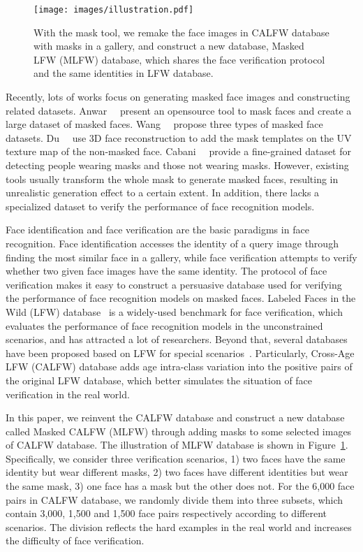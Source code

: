 \documentclass[final]{cvpr}
\begin{document}
\begin{figure}
	\begin{center}
		\texttt{[image: images/illustration.pdf]}
	\end{center}
	\caption{
		With the mask tool, we remake the face images in CALFW database with masks in a gallery, and construct a new database, Masked LFW (MLFW) database, which shares the face verification protocol and the same identities in LFW database.
	}
\label{illustration}
\end{figure}

Recently, lots of works focus on generating masked face images and constructing related datasets.
Anwar~\etal~\cite{anwar2020masked} present an opensource tool to mask faces and create a large dataset of masked faces.
Wang~\etal~\cite{wang2020masked} propose three types of masked face datasets.
Du~\etal~\cite{du2021towards} use 3D face reconstruction to add the mask templates on the UV texture map of the non-masked face.
Cabani~\etal~\cite{cabani2021maskedface} provide a fine-grained dataset for detecting people wearing masks and those not wearing masks.
However, existing tools usually transform the whole mask to generate masked faces, resulting in unrealistic generation effect to a certain extent. In addition, there lacks a specialized dataset to verify the performance of face recognition models.

Face identification and face verification are the basic paradigms in face recognition.
Face identification accesses the identity of a query image through finding the most similar face in a gallery, while face verification attempts to verify whether two given face images have the same identity.
The protocol of face verification makes it easy to construct a persuasive database used for verifying the performance of face recognition models on masked faces.
Labeled Faces in the Wild (LFW) database~\cite{huang2008labeled} is a widely-used benchmark for face verification, which evaluates the performance of face recognition models in the unconstrained scenarios, and has attracted a lot of researchers.
Beyond that, several databases have been proposed based on LFW for special scenarios~\cite{deng2017fine,zheng2017cross,zheng2018cross,zhong2020towards}.
Particularly, Cross-Age LFW \cite{zheng2017cross} (CALFW) database adds age intra-class variation into the positive pairs of the original LFW database, which better simulates the situation of face verification in the real world.

In this paper, we reinvent the CALFW database and construct a new database called Masked CALFW (MLFW) through adding masks to some selected images of CALFW database.
The illustration of MLFW database is shown in Figure~\ref{illustration}.
Specifically, we consider three verification scenarios, 1) two faces have the same identity but wear different masks, 2) two faces have different identities but wear the same mask, 3) one face has a mask but the other does not.
For the 6,000 face pairs in CALFW database, we randomly divide them into three subsets, which contain 3,000, 1,500 and 1,500 face pairs respectively according to different scenarios.
The division reflects the hard examples in the real world and increases the difficulty of face verification.
\end{document}
